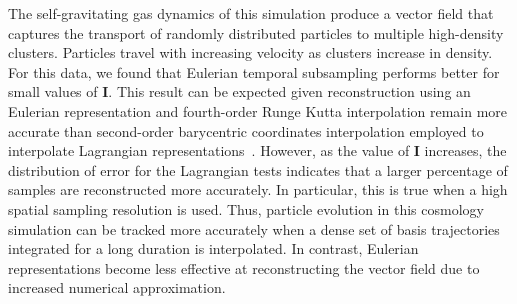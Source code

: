 The self-gravitating gas dynamics of this simulation produce a vector field that captures the transport of randomly distributed particles to multiple high-density clusters.
%
Particles travel with increasing velocity as clusters increase in density.
%
For this data, we found that Eulerian temporal subsampling performs better for small values of \textbf{I}.
%
This result can be expected given reconstruction using an Eulerian representation and fourth-order Runge Kutta interpolation remain more accurate than second-order barycentric coordinates interpolation employed to interpolate Lagrangian representations~\cite{bujack2015lagrangian}\cite{hummel2016error}.
%
%
However, as the value of \textbf{I} increases, the distribution of error for the Lagrangian tests indicates that a larger percentage of samples are reconstructed more accurately.
%
In particular, this is true when a high spatial sampling resolution is used.
%
Thus, particle evolution in this cosmology simulation can be tracked more accurately when a dense set of basis trajectories integrated for a long duration is interpolated.
%
%
%
In contrast, Eulerian representations become less effective at reconstructing the vector field due to increased numerical approximation.
%
%
%

